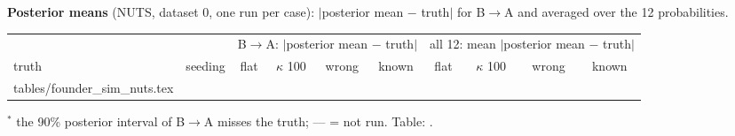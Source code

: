 \documentclass[10pt,a4paper]{article}
\makeatletter
\newcommand{\BA}{B$\to$A}
\newcommand{\tabinput}[1]{\@@input #1 }%
\makeatother
\begin{document}
\textbf{Posterior means} (NUTS, dataset 0, one run per case): $|$posterior mean $-$ truth$|$ for \BA{} and averaged over the 12 probabilities.
\begin{center}\scriptsize\setlength{\tabcolsep}{2.5pt}
\begin{tabular}{@{}llcccc|cccc@{}}\toprule
 & & \multicolumn{4}{c|}{\BA{}: $|$posterior mean $-$ truth$|$} & \multicolumn{4}{c}{all 12: mean $|$posterior mean $-$ truth$|$} \\
truth & seeding & flat & $\kappa$ 100 & wrong & known & flat & $\kappa$ 100 & wrong & known \\\midrule
\tabinput{tables/founder_sim_nuts.tex}\bottomrule
\end{tabular}

$^*$ the 90\% posterior interval of \BA{} misses the truth; --- = not run. Table: .
\end{center}
\end{document}
